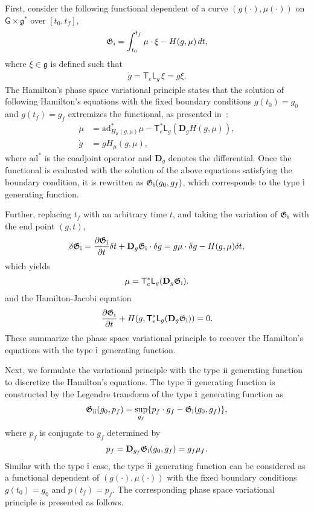 \documentclass[letterpaper, 10pt, conference]{ieeeconf}
\newcommand{\deriv}[2]{\ensuremath{\frac{\partial #1}{\partial #2}}}
\newcommand{\G}{\ensuremath{\mathsf{G}}}
\newcommand{\T}{\ensuremath{\mathsf{T}}}
\renewcommand{\L}{\ensuremath{\mathsf{L}}}
\newcommand{\D}{\ensuremath{\mathbf{D}}}
\newcommand{\ad}{\ensuremath{\mathrm{ad}}}
\newcommand{\g}{\ensuremath{\mathfrak{g}}}
\newcommand{\RomanNumeralCaps}[1]{\textup{\uppercase\expandafter{\romannumeral#1}}}
\newcommand{\RI}{\RomanNumeralCaps{1}}
\newcommand{\RII}{\RomanNumeralCaps{2}}
\begin{document}
First, consider the following functional dependent of a curve $(g(\cdot),\mu(\cdot))$ on $\G\times \g^*$ over $[t_0,t_f]$,
\begin{align}
    \mathfrak{G}_\RI = \int_{t_0}^{t_f} \mu \cdot \xi - H(g,\mu) \, dt,
\end{align}
where $\xi\in\g$ is defined such that
\begin{align}
    \dot g = \T_e \L_{g}\, \xi = g\xi.\label{eqn:g_dot}
\end{align}
The Hamilton's phase space variational principle states that the solution of following Hamilton's equations with the fixed boundary conditions $g(t_0)=g_0$ and $g(t_f)=g_f$ extremizes the functional, as presented in~\cite[Section 8.6.5]{LeeLeo17}:
\begin{align}
    \dot \mu & = \ad^*_{H_\mu(g,\mu)} \mu - \T^*_e \L_g (\D_g H(g,\mu)),\label{eqn:mu_dot}\\
    \dot g & = g H_\mu (g,\mu),\label{eqn:g_dot_H}
\end{align}
where $\ad^*$ is the coadjoint operator and $\D_g$ denotes the differential. 
Once the functional is evaluated with the solution of the above equations satisfying the boundary condition, it is rewritten as $\mathfrak{G}_\RI(g_0, g_f)$, which corresponds to the type $\RI$ generating function.

Further, replacing $t_f$ with an arbitrary time $t$, and taking the variation of $\mathfrak{G}_\RI$ with the end point $(g, t)$,
\begin{align}
    \delta\mathfrak{G}_\RI = \deriv{ \mathfrak{G}_\RI}{t} \delta t + \D_g\mathfrak{G}_\RI \cdot \delta g  = g\mu \cdot \delta g - H(g,\mu) \delta t,\label{eqn:G1}
\end{align}
which yields
\begin{align}
    \mu =\T^*_e \L_g (\D_g \mathfrak{G}_\RI).
\end{align}
and the Hamilton-Jacobi equation
\begin{align}
    \deriv{ \mathfrak{G}_\RI}{t} + H(g, \T^*_e \L_g (\D_g \mathfrak{G}_\RI )) = 0.
\end{align}
These summarize the phase space variational principle to recover the Hamilton's equations with the type $\RI$ generating function. 

Next, we formulate the variational principle with the type $\RII$ generating function to discretize the Hamilton's equations.
The type $\RII$ generating function is constructed by the Legendre transform of the type $\RI$ generating function as
\begin{align}
    \mathfrak{G}_\RII (g_0, p_f) = \sup_{g_f}  \{ p_f \cdot g_f - \mathfrak{G}_\RI (g_0,g_f) \},\label{eqn:G2}
\end{align}
where $p_f$ is conjugate to $g_f$ determined by
\begin{align}
    p_f = \D_{g_f} \mathfrak{G}_\RI (g_0,g_f) = g_f\mu_f.
\end{align}
Similar with the type $\RI$ case, the type $\RII$ generating function can be considered as a functional dependent of $(g(\cdot),\mu(\cdot))$ with the fixed boundary conditions $g(t_0)=g_0$ and $p(t_f)=p_f$.
The corresponding phase space variational principle is presented as follows.
\end{document}
